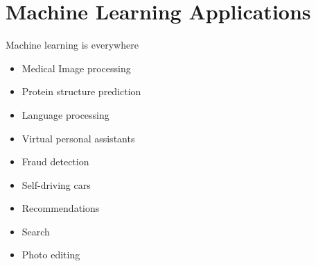 \documentclass{beamer}
\begin{document}
    \section{Machine Learning Applications}
    \begin{frame}{Machine learning is everywhere}
        \begin{itemize}
          \item Medical Image processing
          \item Protein structure prediction
          \item Language processing
          \item Virtual personal assistants
          \item Fraud detection
          \item Self-driving cars
          \item Recommendations
          \item Search
          \item Photo editing
        \end{itemize}
    \end{frame}
  
\end{document}
